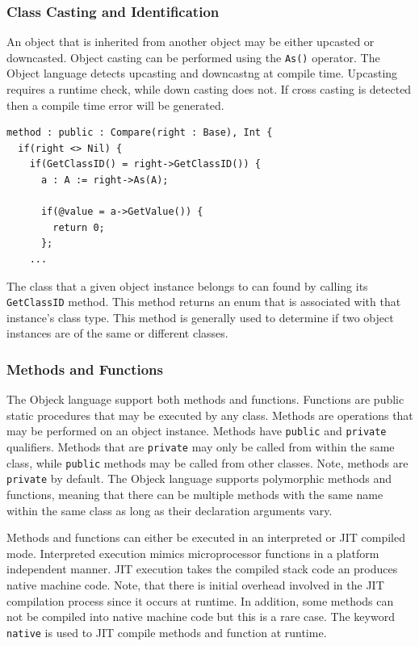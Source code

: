 \documentclass[12pt]{article}
\begin{document}
\subsubsection{Class Casting and Identification}
An object that is inherited from another object may be either upcasted or downcasted.  Object casting can be performed using the \texttt{As()} operator.  The Object language detects upcasting and downcastng at compile time. Upcasting requires a runtime check, while down casting does not. If cross casting is detected then a compile time error will be generated.

\begin{verbatim}
method : public : Compare(right : Base), Int {
  if(right <> Nil) {
    if(GetClassID() = right->GetClassID()) {
      a : A := right->As(A);

      if(@value = a->GetValue()) {
        return 0;
      };
    ...	
\end{verbatim}

The class that a given object instance belongs to can found by calling its \texttt{GetClassID} method.  This method returns an enum that is associated with that instance's class type.  This method is generally used to determine if two object instances are of the same or different classes.

\subsubsection{Methods and Functions}
The Objeck language support both methods and functions.  Functions are public static procedures that may be executed by any class.  Methods are operations that may be performed on an object instance.  Methods have \texttt{public} and \texttt{private} qualifiers.  Methods that are \texttt{private} may only be called from within the same class, while \texttt{public} methods may be called from other classes.  Note, methods are \texttt{private} by default. The Objeck language supports polymorphic methods and functions, meaning that there can be multiple methods with the same name within the same class as long as their declaration arguments vary.

Methods and functions can either be executed in an interpreted or JIT compiled mode. Interpreted execution mimics microprocessor functions in a platform independent manner. JIT execution takes the compiled stack code an produces native machine code. Note, that there is initial overhead involved in the JIT compilation process since it occurs at runtime. In addition, some methods can not be compiled into native machine code but this is a rare case.  The keyword \texttt{native} is used to JIT compile methods and function at runtime.
\end{document}
